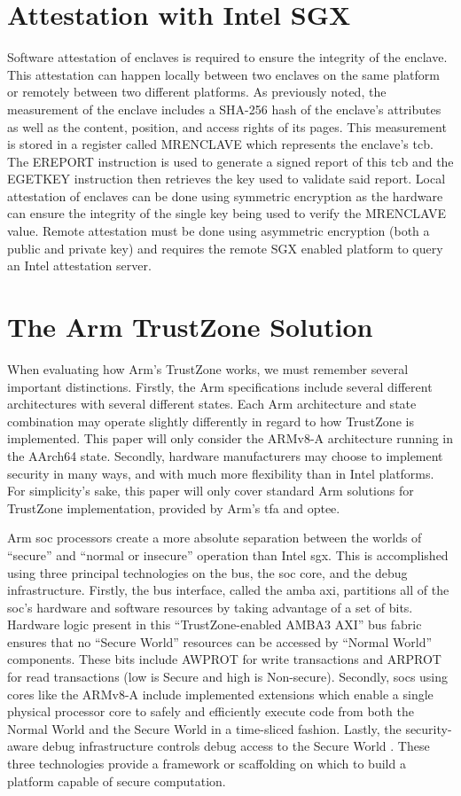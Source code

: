 \section{Attestation with Intel SGX}
Software attestation of enclaves is required to ensure the integrity of the enclave. This attestation can happen locally between two enclaves on the same platform or remotely between two different platforms. As previously noted, the measurement of the enclave includes a SHA-256 hash of the enclave's attributes as well as the content, position, and access rights of its pages. This measurement is stored in a register called MRENCLAVE which represents the enclave's \gls{tcb}. The EREPORT instruction is used to generate a signed report of this \gls{tcb} and the EGETKEY instruction then retrieves the key used to validate said report. Local attestation of enclaves can be done using symmetric encryption as the hardware can ensure the integrity of the single key being used to verify the MRENCLAVE value. Remote attestation must be done using asymmetric encryption (both a public and private key) and requires the remote SGX enabled platform to query an Intel attestation server. 

\section{The Arm TrustZone Solution}
When evaluating how Arm’s TrustZone works, we must remember several important distinctions. Firstly, the Arm specifications include several different architectures with several different states. Each Arm architecture and state combination may operate slightly differently in regard to how TrustZone is implemented. This paper will only consider the ARMv8-A architecture running in the AArch64 state. Secondly, hardware manufacturers may choose to implement security in many ways, and with much more flexibility than in Intel platforms. For simplicity’s sake, this paper will only cover standard Arm solutions for TrustZone implementation, provided by Arm's \gls{tfa} and \gls{optee}.
 
Arm \gls{soc} processors create a more absolute separation between the worlds of ``secure'' and ``normal or insecure'' operation than Intel \gls{sgx}. This is accomplished using three principal technologies on the bus, the \gls{soc} core, and the debug infrastructure. Firstly, the bus interface, called the \gls{amba} \gls{axi}, partitions all of the \gls{soc}’s hardware and software resources by taking advantage of a set of bits. Hardware logic present in this ``TrustZone-enabled AMBA3 AXI'' bus fabric ensures that no ``Secure World'' resources can be accessed by ``Normal World'' components. These bits include AWPROT for write transactions and ARPROT for read transactions (low is Secure and high is Non-secure). Secondly, \gls{soc}s using cores like the ARMv8-A include implemented extensions which enable a single physical processor core to safely and efficiently execute code from both the Normal World and the Secure World in a time-sliced fashion. Lastly, the security-aware debug infrastructure controls debug access to the Secure World \cite{ArmWhitepaper}. These three technologies provide a framework or scaffolding on which to build a platform capable of secure computation.

